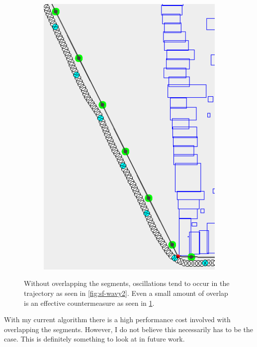 \begin{figure}[h]
\begin{subfigure}[t]{.4\textwidth}
        		\includegraphics[width=\textwidth]{img/sf-wavy2b}
        		\caption{}
        		\label{fig:sf-wavy2b}
	\end{subfigure}	
	
        
    \caption[The effect of overlapping obstacles on oscillations in the trajectory]{Without overlapping the segments, oscillations tend to occur in the trajectory as seen in \ref{fig:sf-wavy2}. Even a small amount of overlap is an effective countermeasure as seen in \ref{fig:sf-wavy2b}.}
    \label{fig:sf-wavy}
\end{figure}
With my current algorithm there is a high performance cost involved with overlapping the segments. However, I do not believe this necessarily has to be the case. This is definitely something to look at in future work.

